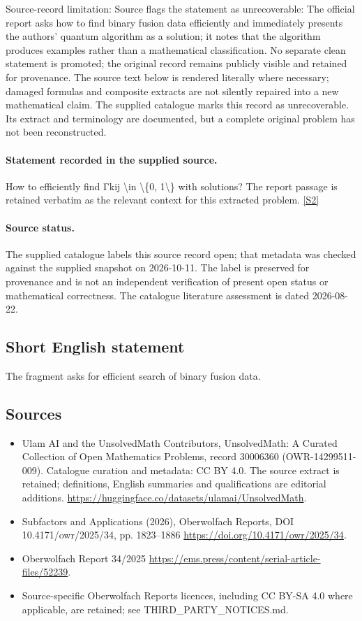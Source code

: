 \documentclass[11pt]{article}
\begin{document}
Source-record limitation: Source flags the statement as unrecoverable: The official report asks how to find binary fusion data efficiently and immediately presents the authors’ quantum algorithm as a solution; it notes that the algorithm produces examples rather than a mathematical classification. No separate clean statement is promoted; the original record remains publicly visible and retained for provenance.
The source text below is rendered literally where necessary; damaged formulas and composite extracts are not silently repaired into a new mathematical claim.
The supplied catalogue marks this record as unrecoverable. Its extract and terminology are documented, but a complete original problem has not been reconstructed.
\paragraph{Statement recorded in the supplied source.}
How to eﬃciently ﬁnd Γkij \textbackslash{}in \textbackslash{}\{0, 1\textbackslash{}\} with solutions? The report passage is retained verbatim as the relevant context for this extracted problem. \href{https://doi.org/10.4171/owr/2025/34}{[S2]}
\paragraph{Source status.}
The supplied catalogue labels this source record open; that metadata was checked against the supplied snapshot on 2026-10-11. The label is preserved for provenance and is not an independent verification of present open status or mathematical correctness. The catalogue literature assessment is dated 2026-08-22.
\subsection{Short English statement}
The fragment asks for efficient search of binary fusion data.
\subsection{Sources}
\begin{itemize}
\item[S1] Ulam AI and the UnsolvedMath Contributors, UnsolvedMath: A Curated Collection of Open Mathematics Problems, record 30006360 (OWR-14299511-009). Catalogue curation and metadata: CC BY 4.0. The source extract is retained; definitions, English summaries and qualifications are editorial additions.
\url{https://huggingface.co/datasets/ulamai/UnsolvedMath}.
\item[S2] Subfactors and Applications (2026), Oberwolfach Reports, DOI 10.4171/owr/2025/34, pp. 1823--1886
\url{https://doi.org/10.4171/owr/2025/34}.
\item[S3] Oberwolfach Report 34/2025
\url{https://ems.press/content/serial-article-files/52239}.
\item Source-specific Oberwolfach Reports licences, including CC BY-SA 4.0 where applicable, are retained; see THIRD\_PARTY\_NOTICES.md.
\end{itemize}
\end{document}
